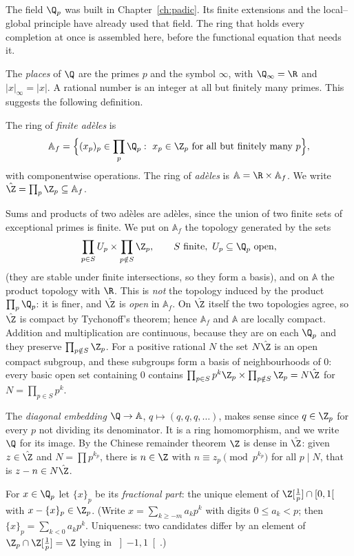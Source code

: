 The field $\Q_p$ was built in Chapter~\ref{ch:padic}. Its finite extensions and the local--global principle have already used that field. The ring that holds every completion at once is assembled here, before the functional equation that needs it.

The \emph{places} of $\Q$ are the primes $p$ and the symbol $\infty$, with $\Q_\infty=\R$ and $|x|_\infty=|x|$. A rational number is
an integer at all but finitely many primes. This suggests the following definition.

\begin{definition}
The ring of \emph{finite ad\`eles} is
\[
\mathbb{A}_f=\Bigl\{(x_p)_p\in\prod_p\Q_p:\ x_p\in\Z_p\text{ for all but finitely many }p\Bigr\},
\]
with componentwise operations. The ring of \emph{ad\`eles} is $\mathbb{A}=\R\times\mathbb{A}_f$. We write $\hat{\Z}=\prod_p\Z_p\subseteq\mathbb{A}_f$.
\end{definition}

Sums and products of two ad\`eles are ad\`eles, since the union of two finite sets of exceptional primes is finite. We put on $\mathbb{A}_f$
the topology generated by the sets
\[
\prod_{p\in S}U_p\times\prod_{p\notin S}\Z_p,\qquad S\text{ finite},\ U_p\subseteq\Q_p\text{ open},
\]
(they are stable under finite intersections, so they form a basis), and on $\mathbb{A}$ the product topology with $\R$. This is
\emph{not} the topology induced by the product $\prod_p\Q_p$: it is finer, and $\hat{\Z}$ is \emph{open} in $\mathbb{A}_f$. On $\hat{\Z}$ itself the
two topologies agree, so $\hat{\Z}$ is compact by Tychonoff's theorem; hence $\mathbb{A}_f$ and $\mathbb{A}$ are locally compact. Addition and
multiplication are continuous, because they are on each $\Q_p$ and they preserve $\prod_{p\notin S}\Z_p$. For a positive rational
$N$ the set $N\hat{\Z}$ is an open compact subgroup, and these subgroups form a basis of neighbourhoods of $0$: every basic open set
containing $0$ contains $\prod_{p\in S}p^k\Z_p\times\prod_{p\notin S}\Z_p=N\hat{\Z}$ for $N=\prod_{p\in S}p^k$.

The \emph{diagonal embedding} $\Q\to\mathbb{A}$, $q\mapsto(q,q,q,\dots)$, makes sense since $q\in\Z_p$ for every $p$ not dividing its
denominator. It is a ring homomorphism, and we write $\Q$ for its image. By the Chinese remainder theorem $\Z$ is dense in $\hat{\Z}$:
given $z\in\hat{\Z}$ and $N=\prod p^{k_p}$, there is $n\in\Z$ with $n\equiv z_p\pmod{p^{k_p}}$ for all $p\mid N$, that is
$z-n\in N\hat{\Z}$.

For $x\in\Q_p$ let $\{x\}_p$ be its \emph{fractional part}: the unique element of $\Z[\frac1p]\cap\left[0,1\right[$ with
$x-\{x\}_p\in\Z_p$. (Write $x=\sum_{k\ge-m}a_kp^k$ with digits $0\le a_k<p$; then $\{x\}_p=\sum_{k<0}a_kp^k$. Uniqueness: two
candidates differ by an element of $\Z_p\cap\Z[\frac1p]=\Z$ lying in $\left]-1,1\right[$.)

